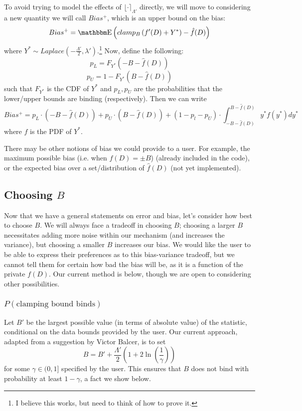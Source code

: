 \documentclass[11pt]{scrartcl} %
\begin{document}
To avoid trying to model the effects of $\lfloor \cdot \rceil_{\Lambda'}$ directly, we will move to considering
a new quantity we will call $Bias^{+}$, which is an upper bound on the bias:
\[ Bias^{+} = \E\left( clamp_B\left( f'(D) + Y^{*} \right) - \hat{f}(D) \right) \]
where $Y^{*} \sim Laplace(-\frac{\Lambda'}{2}, \lambda')$.\footnote{I believe this works,
but need to think of how to prove it.} Now, define the following:
\[ p_L = F_{Y^*}(-B - \hat{f}(D)) \]
\[ p_U = 1 - F_{Y^*}(B - \hat{f}(D)) \]
such that $F_{Y^*}$ is the CDF of $Y^*$ and $p_L, p_U$ are the probabilities that the lower/upper bounds are binding (respectively).
Then we can write
\[ Bias^+ = p_L \cdot (-B - \hat{f}(D)) + p_U \cdot (B - \hat{f}(D)) + (1-p_l-p_U) \cdot \int_{-B-\hat{f}(D)}^{B-\hat{f}(D)}y^* f(y^*) dy^* \]
where $f$ is the PDF of $Y^*$. \newline

There may be other notions of bias we could provide to a user. For example, the maximum possible bias
(i.e. when $f(D) = \pm B$) (already included in the code), or the expected bias over a set/distribution of $\hat{f}(D)$ (not
yet implemented).

\subsection{Choosing $B$}
\label{subsec:choosing_B}
Now that we have a general statements on error and bias, let's consider how best to choose $B$.
We will always face a tradeoff in choosing $B$; choosing a larger $B$ necessitates adding more noise within
our mechanism (and increases the variance), but choosing a smaller $B$ increases our bias.
We would like the user to be able to express their preferences as to this bias-variance tradeoff,
but we cannot tell them for certain how bad the bias will be, as it is a function of the private $f(D)$.
Our current method is below, though we are open to considering other possibilities.

\subsubsection{$P(\text{clamping bound binds})$}
\label{subsubsec:p_clamp_bound_binds}
Let $B'$ be the largest possible value (in terms of absolute value) of the statistic, conditional on the data bounds provided
by the user. Our current approach, adapted from a suggestion by Victor Balcer, is to set
\[ B = B' + \frac{\Lambda'}{2} \left(1 + 2\ln \left( \frac{1}{\gamma} \right) \right) \]
for some $\gamma \in (0,1]$ specified by the user. This ensures that $B$ does not bind with probability at least $1 - \gamma$,
a fact we show below. \newline
\end{document}
